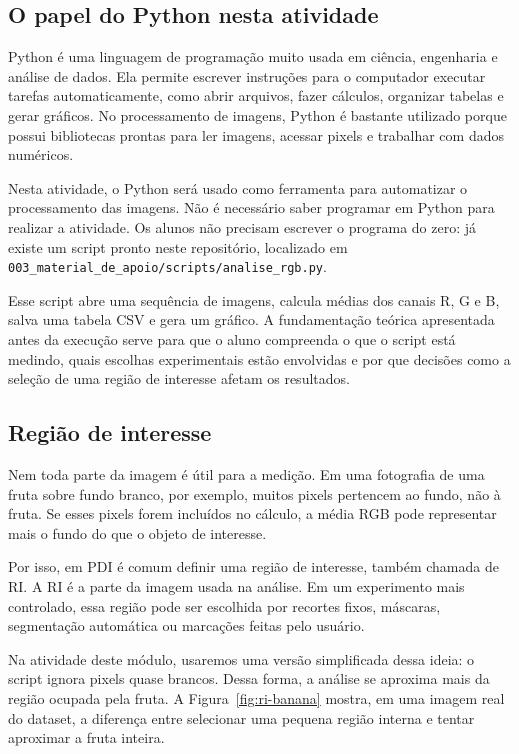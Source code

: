 \documentclass[12pt]{article}
\begin{document}
\subsection{O papel do Python nesta atividade}

Python é uma linguagem de programação muito usada em ciência, engenharia e análise de dados. Ela permite escrever instruções para o computador executar tarefas automaticamente, como abrir arquivos, fazer cálculos, organizar tabelas e gerar gráficos. No processamento de imagens, Python é bastante utilizado porque possui bibliotecas prontas para ler imagens, acessar pixels e trabalhar com dados numéricos.

Nesta atividade, o Python será usado como ferramenta para automatizar o processamento das imagens. Não é necessário saber programar em Python para realizar a atividade. Os alunos não precisam escrever o programa do zero: já existe um script pronto neste repositório, localizado em \texttt{003\_material\_de\_apoio/scripts/analise\_rgb.py}.

Esse script abre uma sequência de imagens, calcula médias dos canais R, G e B, salva uma tabela CSV e gera um gráfico. A fundamentação teórica apresentada antes da execução serve para que o aluno compreenda o que o script está medindo, quais escolhas experimentais estão envolvidas e por que decisões como a seleção de uma região de interesse afetam os resultados.

\subsection{Região de interesse}

Nem toda parte da imagem é útil para a medição. Em uma fotografia de uma fruta sobre fundo branco, por exemplo, muitos pixels pertencem ao fundo, não à fruta. Se esses pixels forem incluídos no cálculo, a média RGB pode representar mais o fundo do que o objeto de interesse.

Por isso, em PDI é comum definir uma região de interesse, também chamada de RI. A RI é a parte da imagem usada na análise. Em um experimento mais controlado, essa região pode ser escolhida por recortes fixos, máscaras, segmentação automática ou marcações feitas pelo usuário.

Na atividade deste módulo, usaremos uma versão simplificada dessa ideia: o script ignora pixels quase brancos. Dessa forma, a análise se aproxima mais da região ocupada pela fruta. A Figura~\ref{fig:ri-banana} mostra, em uma imagem real do dataset, a diferença entre selecionar uma pequena região interna e tentar aproximar a fruta inteira.
\end{document}
